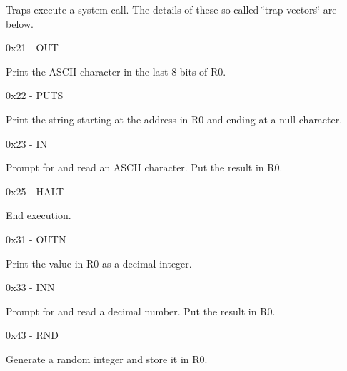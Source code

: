 Traps execute a system call. The details of these so-\/called \char`\"{}trap vectors\char`\"{} are below. \begin{DoxyItemize}
\item 0x21 -\/ OUT 
\begin{DoxyItemize}
\item Print the ASCII character in the last 8 bits of R0.
\end{DoxyItemize}\item 0x22 -\/ PUTS 
\begin{DoxyItemize}
\item Print the string starting at the address in R0 and ending at a null character.
\end{DoxyItemize}\item 0x23 -\/ IN 
\begin{DoxyItemize}
\item Prompt for and read an ASCII character. Put the result in R0.
\end{DoxyItemize}\item 0x25 -\/ HALT 
\begin{DoxyItemize}
\item End execution.
\end{DoxyItemize}\item 0x31 -\/ OUTN 
\begin{DoxyItemize}
\item Print the value in R0 as a decimal integer.
\end{DoxyItemize}\item 0x33 -\/ INN 
\begin{DoxyItemize}
\item Prompt for and read a decimal number. Put the result in R0.
\end{DoxyItemize}\item 0x43 -\/ RND 
\begin{DoxyItemize}
\item Generate a random integer and store it in R0.
\end{DoxyItemize}\end{DoxyItemize}
